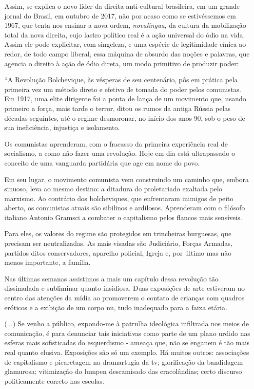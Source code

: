 Assim, se explica o novo líder da direita anti-cultural brasileira, em
um grande jornal do Brasil, em outubro de 2017, não por acaso como se
estivéssemos em 1967, que tenta nos ensinar a nova ordem,
\emph{novalíngua}, da cultura da mobilização total da nova direita, cujo
lastro político real é a ação universal do ódio na vida. Assim ele pode
explicitar, com singeleza, e uma espécie de legitimidade cínica ao
redor, de todo campo liberal, essa máquina de absurdo das noções e
palavras, que agencia o direito à ação de ódio direta, um modo primitivo
de produzir poder:

``A Revolução Bolchevique, às vésperas de seu centenário, pôs em prática
pela primeira vez um método direto e efetivo de tomada do poder pelos
comunistas. Em 1917, uma elite dirigente foi a ponta de lança de um
movimento que, usando primeiro a força, mais tarde o terror, ditou os
rumos da antiga Rússia pelas décadas seguintes, até o regime desmoronar,
no início dos anos 90, sob o peso de sua ineficiência, injustiça e
isolamento.

Os comunistas aprenderam, com o fracasso da primeira experiência real de
socialismo, a como não fazer uma revolução. Hoje em dia está
ultrapassado o conceito de uma vanguarda partidária que age em nome do
povo.

Em seu lugar, o movimento comunista vem construindo um caminho que,
embora sinuoso, leva ao mesmo destino: a ditadura do proletariado
exaltada pelo marxismo. Ao contrário dos bolcheviques, que enfrentaram
inimigos de peito aberto, os comunistas atuais são sibilinos e
ardilosos. Aprenderam com o filósofo italiano Antonio Gramsci a combater
o capitalismo pelos flancos mais sensíveis.

Para eles, os valores do regime são protegidos em trincheiras burguesas,
que precisam ser neutralizadas. As mais visadas são Judiciário, Forças
Armadas, partidos ditos conservadores, aparelho policial, Igreja e, por
último mas não menos importante, a família.

Nas últimas semanas assistimos a mais um capítulo dessa revolução tão
dissimulada e subliminar quanto insidiosa. Duas exposições de arte
estiveram no centro das atenções da mídia ao promoverem o contato de
crianças com quadros eróticos e a exibição de um corpo nu, tudo
inadequado para a faixa etária.

(...) Se venho a público, expondo-me à patrulha ideológica infiltrada
nos meios de comunicação, é para denunciar tais iniciativas como parte
de um plano urdido nas esferas mais sofisticadas do esquerdismo - ameaça
que, não se enganem é tão mais real quanto elusiva. Exposições são só um
exemplo. Há muitos outros: associações de capitalismo e picaretagem na
dramartugia da tv; glorificação da bandidagem glamurosa; vitimização do
lumpen descamisado das cracolândias; certo discurso politicamente
correto nas escolas.

